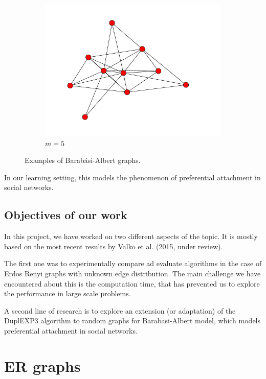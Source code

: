 \documentclass[10pt,a4paper]{scrartcl}
\begin{document}
\begin{figure}[h!]
\begin{center}
\begin{subfigure}[b]{0.3\textwidth}
                \includegraphics[width=\textwidth]{figures/BA_graph_5.pdf}
                \caption{$m=5$}
        \end{subfigure}
\end{center}
\caption{Examples of Barabási-Albert graphs.}
 \label{ba_ex}
\end{figure}


In our learning setting, this models the phenomenon of preferential attachment in social networks.


\subsection{Objectives of our work}

In this project, we have worked on two different aspects of the topic. It is mostly based on the most recent results by Valko et al. (2015, under review).

 The first one was to experimentally compare ad evaluate algorithms in the case of Erdos Renyi
graphs with unknown edge distribution. The main challenge we have encountered about this is the computation time, that has prevented us to explore the performance in large scale problems.

A second line of research is to explore an extension (or adaptation) of the DuplEXP3 algorithm to random graphs for Barabasi-Albert model, which models preferential attachment in social networks.

\section{ER graphs}
\end{document}
